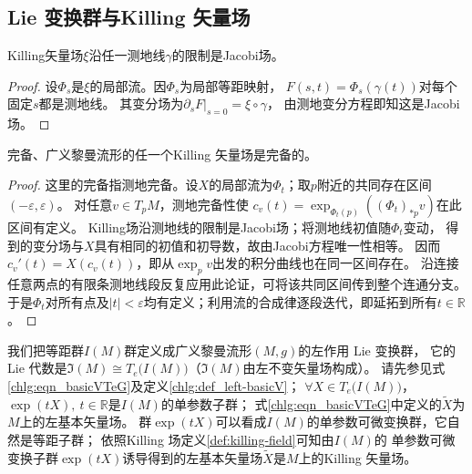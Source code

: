 \subsection{Lie 变换群与Killing 矢量场}

\begin{proposition}
Killing矢量场$\xi$沿任一测地线$\gamma$的限制是Jacobi场。
\end{proposition}
\begin{proof}
设$\Phi_s$是$\xi$的局部流。因$\Phi_s$为局部等距映射，
$F(s,t)=\Phi_s(\gamma(t))$对每个固定$s$都是测地线。
其变分场为$\left.\partial_sF\right|_{s=0}=\xi\circ\gamma$，
由测地变分方程即知这是Jacobi场。
\end{proof}

\begin{theorem}\label{chlg:thm_comp-kill}
    完备、广义黎曼流形的任一个Killing 矢量场是完备的。
\end{theorem}
\begin{proof}
    这里的完备指测地完备。设$X$的局部流为$\Phi_t$；取$p$附近的共同存在区间$(-\varepsilon,\varepsilon)$。
    对任意$v\in T_pM$，测地完备性使
    $c_v(t)=\exp_{\Phi_t(p)}((\Phi_t)_{*p}v)$在此区间有定义。
    Killing场沿测地线的限制是Jacobi场；将测地线初值随$\Phi_t$变动，
    得到的变分场与$X$具有相同的初值和初导数，故由Jacobi方程唯一性相等。
    因而$c_v'(t)=X(c_v(t))$，即从$\exp_pv$出发的积分曲线也在同一区间存在。
    沿连接任意两点的有限条测地线段反复应用此论证，可将该共同区间传到整个连通分支。
    于是$\Phi_t$对所有点及$|t|<\varepsilon$均有定义；利用流的合成律逐段迭代，即延拓到所有$t\in\mathbb R$。
\end{proof}

我们把等距群$I(M)$群定义成广义黎曼流形$(M,g)$的左作用 Lie 变换群，
它的 Lie 代数是$\mathfrak{I}(M)\cong T_e\bigl(I(M)\bigr)$（$\mathfrak{I}(M)$由左不变矢量场构成）。
请先参见式\eqref{chlg:eqn_basicVTeG}及定义\ref{chlg:def_left-basicV}；
$\forall X\in T_e\bigl(I(M)\bigr)$，$\exp(t X),\ t\in \mathbb{R}$是$I(M)$的单参数子群；
式\eqref{chlg:eqn_basicVTeG}中定义的$\widetilde{X}$为$M$上的左基本矢量场。
群$\exp(t X)$可以看成$I(M)$的单参数可微变换群，它自然是{等距}子群；
依照Killing 场定义\ref{def:killing-field}可知由$I(M)$的
单参数可微变换子群$\exp(t X)$诱导得到的左基本矢量场$\widetilde{X}$是$M$上的Killing 矢量场。

